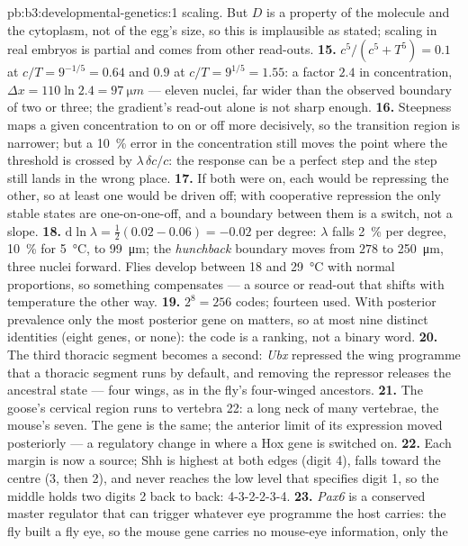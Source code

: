 \begin{solution}{pb:b3:developmental-genetics:1}
scaling. But $D$ is a property of the molecule and the cytoplasm, not of
the egg's size, so this is implausible as stated; scaling in real
embryos is partial and comes from other read-outs.
\textbf{15.} $c^{5}/(c^{5} + T^{5}) = 0.1$ at $c/T = 9^{-1/5} = 0.64$ and
$0.9$ at $c/T = 9^{1/5} = 1.55$: a factor $2.4$ in concentration,
$\Delta x = 110\ln 2.4 = \qty{97}{\micro m}$ --- eleven nuclei, far
wider than the observed boundary of two or three; the gradient's
read-out alone is not sharp enough.
\textbf{16.} Steepness maps a given concentration to on or off more
decisively, so the transition region is narrower; but a \qty{10}{\%}
error in the concentration still moves the point where the threshold
is crossed by $\lambda\,\delta c/c$: the response can be a perfect step
and the step still lands in the wrong place.
\textbf{17.} If both were on, each would be repressing the other, so
at least one would be driven off; with cooperative repression the only
stable states are one-on-one-off, and a boundary between them is a
switch, not a slope.
\textbf{18.} $\mathrm{d}\ln\lambda = \tfrac{1}{2}(0.02 - 0.06) = -0.02$
per degree: $\lambda$ falls \qty{2}{\%} per degree, \qty{10}{\%} for
\qty{5}{\celsius}, to \qty{99}{\micro m}; the \emph{hunchback}
boundary moves from $278$ to \qty{250}{\micro m}, three nuclei forward.
Flies develop between \qty{18}{} and \qty{29}{\celsius} with normal
proportions, so something compensates --- a source or read-out that
shifts with temperature the other way.
\textbf{19.} $2^{8} = 256$ codes; fourteen used. With posterior
prevalence only the most posterior gene on matters, so at most nine
distinct identities (eight genes, or none): the code is a ranking, not
a binary word.
\textbf{20.} The third thoracic segment becomes a second: \emph{Ubx}
repressed the wing programme that a thoracic segment runs by default,
and removing the repressor releases the ancestral state --- four wings,
as in the fly's four-winged ancestors.
\textbf{21.} The goose's cervical region runs to vertebra 22: a long
neck of many vertebrae, the mouse's seven. The gene is the same; the
anterior limit of its expression moved posteriorly --- a regulatory
change in where a Hox gene is switched on.
\textbf{22.} Each margin is now a source; Shh is highest at both edges
(digit 4), falls toward the centre (3, then 2), and never reaches the
low level that specifies digit 1, so the middle holds two digits 2 back
to back: 4-3-2-2-3-4.
\textbf{23.} \emph{Pax6} is a conserved master regulator that can
trigger whatever eye programme the host carries: the fly built a fly
eye, so the mouse gene carries no mouse-eye information, only the

\end{solution}
